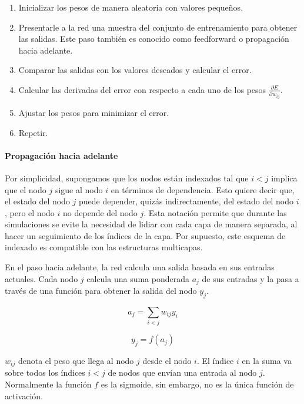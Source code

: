 \begin{enumerate}
    \item Inicializar los pesos de manera aleatoria con valores pequeños.
    \item Presentarle a la red una muestra del conjunto de entrenamiento para obtener las salidas. Este paso 
    también es conocido como feedforward o propagación hacia adelante.
    \item Comparar las salidas con los valores deseados y calcular el error.
    \item Calcular las derivadas del error con respecto a cada uno de los pesos $\frac{\partial E}{\partial w_{ij}}$.
    \item Ajustar los pesos para minimizar el error.
    \item Repetir.
\end{enumerate}




\paragraph{Propagación hacia adelante}
Por simplicidad, supongamos que los nodos están indexados tal que $i < j$ implica que 
el nodo $j$ sigue al nodo $i$ en términos de dependencia. Esto quiere decir que,
el estado del nodo $j$ puede depender, quizás indirectamente, del estado 
del nodo $i$, pero el nodo $i$ no depende del nodo $j$. Esta notación permite que durante
las simulaciones se evite la necesidad de lidiar con cada capa de manera separada,
al hacer un seguimiento de los índices de la capa. Por supuesto, este esquema de
indexado es compatible con las estructuras multicapas.

En el paso hacia adelante, la red calcula una salida basada en sus entradas actuales. Cada nodo
$j$ calcula una suma ponderada $a_j$ de sus entradas y la pasa a través de una función
para obtener la salida del nodo $y_j$.

\[
a_j = \sum_{i < j} w_{ij} y_i
\]

\[
y_j = f(a_j)
\]

$w_{ij}$ denota el peso que llega al nodo $j$ desde el nodo $i$. El índice $i$ en la suma
va sobre todos los índices $i < j$ de nodos que envían una entrada al nodo $j$. Normalmente
la función $f$ es la sigmoide, sin embargo, no es la única función de activación.

